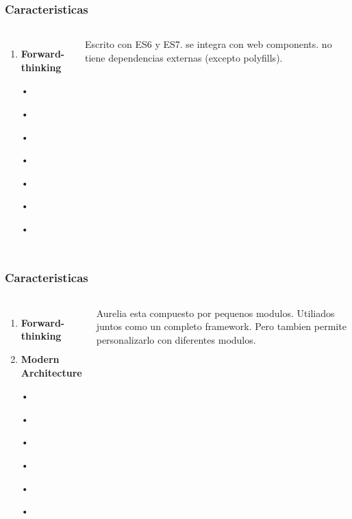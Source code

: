 \documentclass{beamer}
\begin{document}
\begin{frame}
\frametitle{Caracteristicas}
\begin{columns}[c] %

\begin{enumerate}
\item \textbf{Forward-thinking}
\item[•]
\item[•]
\item[•]
\item[•]
\item[•]
\item[•]
\item[•]
\end{enumerate}

Escrito con ES6 y ES7. se integra con web components. no tiene dependencias externas (excepto polyfills).
\end{columns}
\end{frame}


\begin{frame}
\frametitle{Caracteristicas}
\begin{columns}[c] %

\begin{enumerate}
\item \textbf{Forward-thinking}
\item \textbf{Modern Architecture}
\item[•]
\item[•]
\item[•]
\item[•]
\item[•]
\item[•]
\end{enumerate}

Aurelia esta compuesto por pequenos modulos. Utiliados juntos como un completo framework. Pero tambien permite personalizarlo con diferentes modulos.
\end{columns}
\end{frame}
\end{document}
